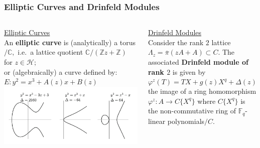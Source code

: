 \documentclass{beamer}
\numberwithin{equation}{section}
\numberwithin{case}{theorem}
\newcommand{\cH}{\mathcal{H}}		%
\newcommand{\bbC}{\mathbb{C}}		%
\newcommand{\bbF}{\mathbb{F}}		%
\newcommand{\bbZ}{\mathbb{Z}}		%
\newcommand{\<}{\left\langle}
\renewcommand{\>}{\right\rangle}
\begin{document}
\begin{frame}
	\frametitle{Elliptic Curves and Drinfeld Modules}
	
	\begin{columns} 
		\begin{column}{.5\textwidth}
			\underline{Elliptic Curves}\\
			An \textbf{elliptic curve} is (analytically) a torus$/\bbC,$ \pause 
			i.e.\ a lattice quotient $\bbC/(\bbZ z+\bbZ)$ for $z\in \cH;$\\ \pause
			or (algebraically) a curve defined by: 
			$E: y^2=x^3+A(z)x+B(z)$\pause\\
			\includegraphics[scale=0.4]{Silverman_Fig31.png}\\
			\cite[Figure $3.1$]{Silverman-arithmetic-elliptic-curves}
		\end{column}\pause
		\begin{column}{.5\textwidth}
			\underline{Drinfeld Modules}\\
			
			Consider the rank $2$ lattice $\Lambda_z=\overline{\pi}(zA+A)\subset C.$\pause
			The associated \textbf{Drinfeld module of rank $2$} is given by \[\varphi^z(T)=TX+g(z)X^q+\Delta(z)X^{q^2},\]\pause
			the image of a ring homomorphism $\varphi^z: A\to C\{X^q\}$ where $C\{X^q\}$ is the non-commutative ring of $\bbF_q$-linear polynomials$/C.$ 
		\end{column}%
	\end{columns}
\end{frame}
	
\end{document}

